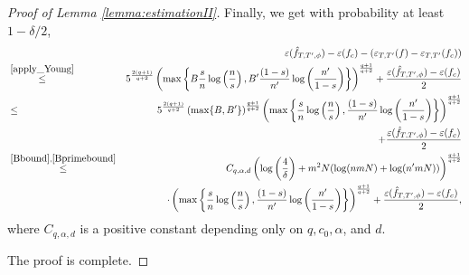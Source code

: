 \documentclass{article}
\newtheorem{lemma}{Lemma}
\begin{document}
\begin{proof}[Proof of Lemma \ref{lemma:estimationII}]
Finally, we get with probability at least $1-\delta/2$,
\begin{eqnarray*}
    &&  \varepsilon (\Hat{f}_{T, T^\prime,\phi}) - \varepsilon (f_c) - \left(\varepsilon_{T, T'} (f) - \varepsilon_{T, T'} (f_c)\right)\\ 
    &\stackrel{\eqref{apply_Young}}{\leq}&  5^{\frac{2(q+1)}{q+2}}  \left(  \max\left\{ B \frac{s}{n}
    \log \left(\frac{n}{s}\right), B^\prime \frac{(1-s)}{n^\prime}\log \left(\frac{n^\prime}{1-s}\right) \right\} \right)^{\frac{q+1}{q+2}} + \frac{\varepsilon (\Hat{f}_{T, T^\prime,\phi}) - \varepsilon (f_c)}{2} \\
 &\leq&  5^{\frac{2(q+1)}{q+2}}  \left(\max\{B, B^\prime\}\right)^{\frac{q+1}{q+2}}\left(  \max\left\{  \frac{s}{n}
\log \left(\frac{n}{s}\right), \frac{(1-s)}{n^\prime}\log \left(\frac{n^\prime}{1-s}\right) \right\} \right)^{\frac{q+1}{q+2}}\\
&&\qquad\qquad+ \frac{\varepsilon (\Hat{f}_{T, T^\prime,\phi}) - \varepsilon (f_c)}{2} \\
&\stackrel{\eqref{Bbound}, \eqref{Bprimebound}}{\leq}& C_{q,\alpha, d} \left(\log \left(\frac{4}{\delta}\right) + m^2 N (\log(nmN)+\log(n^\prime mN))\right)^{\frac{q+1}{q+2}} \\
&& \cdot \left(  \max\left\{  \frac{s}{n}
\log \left(\frac{n}{s}\right), \frac{(1-s)}{n^\prime}\log \left(\frac{n^\prime}{1-s}\right) \right\} \right)^{\frac{q+1}{q+2}} 
 + \frac{\varepsilon (\Hat{f}_{T, T^\prime,\phi}) - \varepsilon (f_c)}{2}, 
\end{eqnarray*}
where $C_{q,\alpha, d}$ is a positive constant depending only on $q,c_0, \alpha$, and $d$. 

The proof is complete.
\end{proof}
\end{document}
